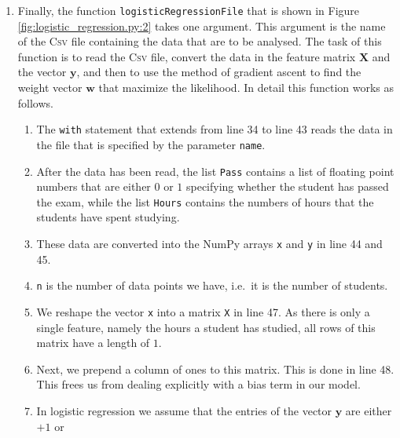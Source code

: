 \begin{enumerate}
      \\[0.2cm]
      \hspace*{1.3cm}
      $\ds \frac{\partial\quad}{\partial\, w_j}\ell\ell(\mathbf{X},\mathbf{y},\mathbf{w}) =
        \ds\sum\limits_{i=1}^n y_i \cdot x_{i,j} \cdot  S(-y_i \cdot \mathbf{x}_i \cdot \mathbf{w})
      $.
      \\[0.2cm]
      The different components of this gradient are combined into a vector.
      The arguments are the same as the arguments to the log-likelihood.
\item Finally, the function \texttt{logisticRegressionFile} that is shown in Figure
      \ref{fig:logistic_regression.py:2} takes one argument.  This argument
      is the name of the \textsc{Csv} file containing the data that are to be analysed.  
      The task of this function is to read the \textsc{Csv} file, convert the data in the feature matrix
      $\mathbf{X}$ and the vector $\mathbf{y}$, and then to use the method of gradient ascent to find the weight vector
      $\mathbf{w}$ that maximize the likelihood.  In detail this function works as follows.
      \begin{enumerate}
      \item The \texttt{with} statement that extends from line 34 to line 43 reads the data in the file that
            is specified by the parameter \texttt{name}.
      \item After the data has been read, the list \texttt{Pass} contains a list of floating point numbers that
            are either $0$ or $1$ specifying whether the student has passed the exam, while the list
            \texttt{Hours} contains the numbers of hours that the students have spent studying.
      \item These data are converted into the NumPy arrays \texttt{x} and \texttt{y} in line 44 and 45.
      \item \texttt{n} is the number of data points we have, i.e.~it is the number of students.
      \item We reshape the vector \texttt{x} into a matrix \texttt{X} in line 47.
            As there is only a single feature, namely the hours a student has studied, all rows of this matrix
            have a length of $1$. 
      \item Next, we prepend a column of ones to this matrix.  This is done in line 48.
            This frees us from dealing explicitly with a bias term in our model.      
      \item In logistic regression we assume that the entries of the vector $\mathbf{y}$ are either $+1$ or

\end{enumerate}
\end{enumerate}
